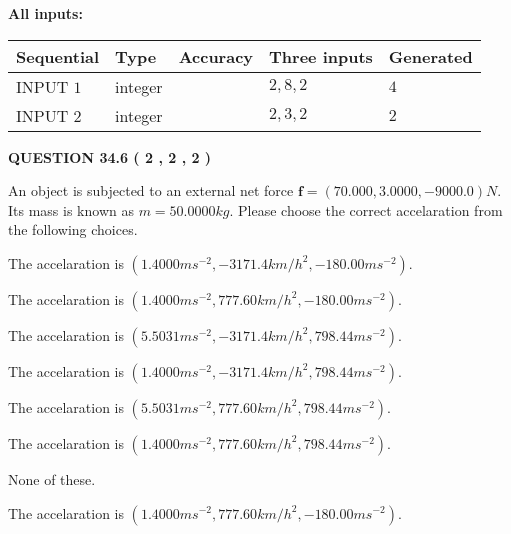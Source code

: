 \documentclass[12pt]{article}
\begin{document}
   
\noindent\vspace{0.1in}\hspace{-0.08in} {\textbf{\Large{All inputs: }}}
   
   
  
  
\noindent\begin{tabular}{|l|l|l|l|l|}
\hline
 Sequential & Type & Accuracy & Three inputs & Generated \\ 
\hline
 
 
  INPUT $            1 $ & integer &  & $
 2
 , 
 8
 , 
 2
 $ & $ 4 $ 
 \\  \hline  
 
 
  INPUT $            2 $ & integer &  & $
 2
 , 
 3
 , 
 2
 $ & $ 2 $ 
 \\  \hline  
 \end{tabular}
   
   
  
\vspace{0.2in}
  
{\textbf{\Large{QUESTION
34.6 
 (           2 ,           2 ,           2 )
}}}
  
  
 
An object is subjected to an external net force $\mathbf{f}=(
70.000 ,
3.0000,
-9000.0  )N$. Its mass is known as
$m= %
50.0000  kg$. Please choose the correct accelaration
from the following choices.
 
 
 
The accelaration is
$(
1.4000ms^{-2},
-3171.4km/h^2,
-180.00ms^{-2}
).
$
 
 
The accelaration is
$(
1.4000ms^{-2},
777.60km/h^2,
-180.00ms^{-2}
).
$
 
 
The accelaration is
$(
5.5031ms^{-2},
-3171.4km/h^2,
798.44ms^{-2}
).
$
 
 
The accelaration is
$(
1.4000ms^{-2},
-3171.4km/h^2,
798.44ms^{-2}
).
$
 
 
The accelaration is
$(
5.5031ms^{-2},
777.60km/h^2,
798.44ms^{-2}
).
$
 
 
The accelaration is
$(
1.4000ms^{-2},
777.60km/h^2,
798.44ms^{-2}
).
$
 
 
 None of these.
 
 
\noindent{}
 
 
The accelaration is
$(
1.4000ms^{-2},
777.60km/h^2,
-180.00ms^{-2}
).
$
 
\end{document}
